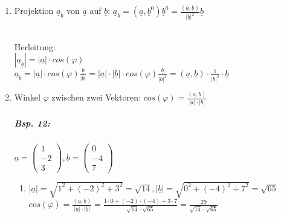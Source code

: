\begin{enumerate}
\item Projektion $\underline{a}_{\underline{b}}$ von $\underline{a}$ auf $\underline{b}$: $\boxed{\underline{a}_{\underline{b}}=(\underline{a}, \underline{b}^0)\underline{b}^0=\frac{(\underline{a}, \underline{b})}{|\underline{b}|^2}\underline{b}}$\\
\\
Herleitung:\\
$|\underline{a}_{\underline{b}}|=|\underline{a}|\cdot cos(\varphi)$\\
$\underline{a}_{\underline{b}}=|\underline{a}|\cdot cos(\varphi)\frac{\underline{b}}{|\underline{b}|}=|\underline{a}| \cdot |\underline{b}| \cdot cos (\varphi) \frac{\underline{b}}{|\underline{b}|^2}=(\underline{a}, \underline{b})\cdot \frac{1}{|\underline{b}|^2}\cdot \underline{b}$
\item Winkel $\varphi$ zwischen zwei Vektoren: $\boxed{cos(\varphi)=\frac{(\underline{a}, \underline{b})}{|\underline{a}|\cdot |\underline{b}|}}$
\subparagraph{Bsp. 12:} \parskp
$\underline{a}=\begin{pmatrix}
1\\
-2\\
3
\end{pmatrix}, \underline{b}=\begin{pmatrix}
0\\
-4\\
7
\end{pmatrix}$
\begin{enumerate} [label=\alph*.)]
\item $|\underline{a}| = \sqrt{1^2+(-2)^2+3^2}=\sqrt{14}, |\underline{b}|=\sqrt{0^2+(-4)^2+7^2}=\sqrt{65}$\\
$cos(\varphi)=\frac{(\underline{a}, \underline{b})}{|\underline{a}|\cdot |\underline{b}|}=\frac{1 \cdot 0 + (-2) \cdot (-4) + 3\cdot 7}{\sqrt{14} \cdot \sqrt{65}}=\frac{29}{\sqrt{14} \cdot \sqrt{65}}$\\

\end{enumerate}
\end{enumerate}
